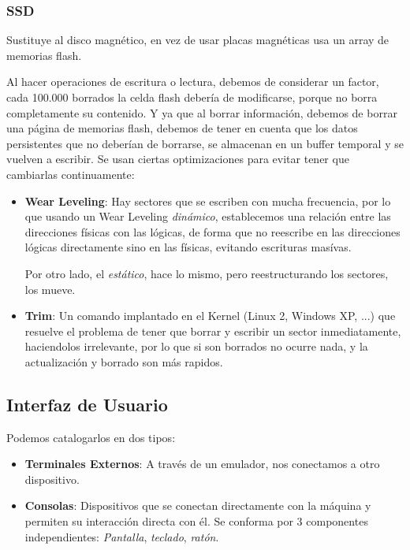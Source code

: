 \subsubsection{SSD}
\noindent Sustituye al disco magnético, en vez de usar placas magnéticas usa un array de memorias flash.
\par \noindent Al hacer operaciones de escritura o lectura, debemos de considerar un factor, cada 100.000 borrados la celda flash debería de modificarse, porque no borra completamente su contenido. Y ya que al borrar información, debemos de borrar una página de memorias flash, debemos de tener en cuenta que los datos persistentes que no deberían de borrarse, se almacenan en un buffer temporal y se vuelven a escribir. Se usan ciertas optimizaciones para evitar tener que cambiarlas continuamente:
\begin{itemize}
        \item \textbf{Wear Leveling}: Hay sectores que se escriben con mucha frecuencia, por lo que usando un Wear Leveling \textit{dinámico}, establecemos una relación entre las direcciones físicas con las lógicas, de forma que no reescribe en las direcciones lógicas directamente sino en las físicas, evitando escrituras masívas.\par \noindent Por otro lado, el \textit{estático}, hace lo mismo, pero reestructurando los sectores, los mueve.
        \item \textbf{Trim}: Un comando implantado en el Kernel (Linux 2, Windows XP, ...) que resuelve el problema de tener que borrar y escribir un sector inmediatamente, haciendolos irrelevante, por lo que si son borrados no ocurre nada, y la actualización y borrado son más rapidos.
\end{itemize}
\subsection{Interfaz de Usuario}
\noindent Podemos catalogarlos en dos tipos:
\begin{itemize}
        \item \textbf{Terminales Externos}: A través de un emulador, nos conectamos a otro dispositivo.
        \item \textbf{Consolas}: Dispositivos que se conectan directamente con la máquina y permiten su interacción directa con él. Se conforma por 3 componentes independientes: \textit{Pantalla}, \textit{teclado}, \textit{ratón}.
\end{itemize}

